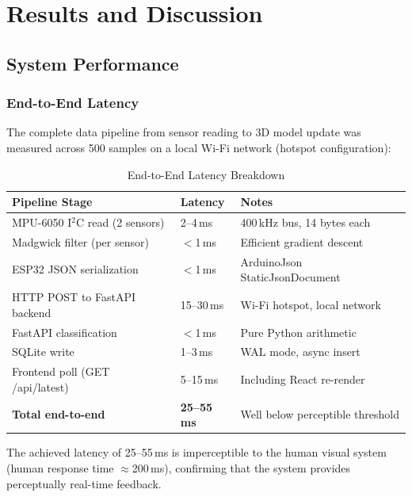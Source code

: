 \documentclass[12pt,a4paper]{report}
\begin{document}
\chapter{Results and Discussion}

\section{System Performance}

\subsection{End-to-End Latency}

The complete data pipeline from sensor reading to 3D model update was measured across 500 samples on a local Wi-Fi network (hotspot configuration):

\begin{table}[H]
\centering
\caption{End-to-End Latency Breakdown}
\label{tab:latency}
\begin{tabular}{lll}
\toprule
\textbf{Pipeline Stage} & \textbf{Latency} & \textbf{Notes} \\
\midrule
MPU-6050 I$^2$C read (2 sensors) & 2--4\,ms   & 400\,kHz bus, 14 bytes each \\
Madgwick filter (per sensor)     & $<$1\,ms   & Efficient gradient descent \\
ESP32 JSON serialization         & $<$1\,ms   & ArduinoJson StaticJsonDocument \\
HTTP POST to FastAPI backend     & 15--30\,ms & Wi-Fi hotspot, local network \\
FastAPI classification           & $<$1\,ms   & Pure Python arithmetic \\
SQLite write                     & 1--3\,ms   & WAL mode, async insert \\
Frontend poll (GET /api/latest)  & 5--15\,ms  & Including React re-render \\
\midrule
\textbf{Total end-to-end}        & \textbf{25--55\,ms} & Well below perceptible threshold \\
\bottomrule
\end{tabular}
\end{table}

The achieved latency of 25--55\,ms is imperceptible to the human visual system (human response time $\approx$200\,ms), confirming that the system provides perceptually real-time feedback.
\end{document}
